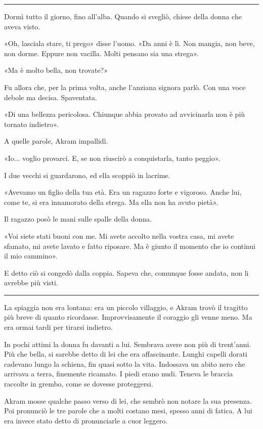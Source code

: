 \documentclass[a4paper,10pt]{memoir}
\begin{document}
\plainbreak{1}

Dormì tutto il giorno, fino all'alba. Quando si svegliò, chiese della donna che
aveva visto.

«Oh, lasciala stare, ti prego» disse l'uomo. «Da anni è lì. Non mangia, non
beve, non dorme. Eppure non vacilla. Molti pensano sia una strega».

«Ma è molto bella, non trovate?»

Fu allora che, per la prima volta, anche l'anziana signora parlò. Con una voce
debole ma decisa. Spaventata.

«Di una bellezza pericolosa. Chiunque abbia provato ad avvicinarla non è più
tornato indietro».

A quelle parole, Akram impallidì.

«Io... voglio provarci. E, se non riuscirò a conquistarla, tanto peggio».

I due vecchi si guardarono, ed ella scoppiò in lacrime.

«Avevamo un figlio della tua età. Era un ragazzo forte e vigoroso. Anche lui,
come te, si era innamorato della strega. Ma ella non ha avuto pietà».

Il ragazzo posò le mani sulle spalle della donna.

«Voi siete stati buoni con me. Mi avete accolto nella vostra casa, mi avete
sfamato, mi avete lavato e fatto riposare. Ma è giunto il momento che io
continui il mio cammino».

E detto ciò si congedò dalla coppia. Sapeva che, comunque fosse andata, non
li avrebbe più visti.

\plainbreak{1}

La spiaggia non era lontana: era un piccolo villaggio, e Akram trovò il tragitto
più breve di quanto ricordasse. Improvvisamente il coraggio gli venne meno. Ma
era ormai tardi per tirarsi indietro.

In pochi attimi la donna fu davanti a lui. Sembrava avere non più di
trent'anni. Più che bella, si sarebbe detto di lei che era affascinante. Lunghi
capelli dorati cadevano lungo la schiena, fin quasi sotto la vita. Indossava un
abito nero che arrivava a terra, finemente ricamato. I piedi erano nudi. Teneva
le braccia raccolte in grembo, come se dovesse proteggersi.

Akram mosse qualche passo verso di lei, che sembrò non notare la sua presenza.
Poi pronunciò le tre parole che a molti costano mesi, spesso anni di fatica. A
lui era invece stato detto di pronunciarle a cuor leggero.
\end{document}
